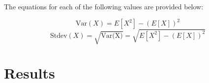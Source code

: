 \documentclass[12pt,letterpaper]{article}
\numberwithin{equation}{section}
\begin{document}
The equations for each of the following values are provided below:

\begin{equation}
\text{Var} \left( X\right)  =E\left[ X^{2}\right]  -\left( E\left[ X\right]  \right)^{2}  
\end{equation}
\begin{equation}
\text{Stdev} \left( X\right)  =\sqrt{\text{Var(X)} } =\sqrt{E\left[ X^{2}\right]  -\left( E\left[ X\right]  \right)^{2}  } 
\end{equation}


\section{Results}
\end{document}
